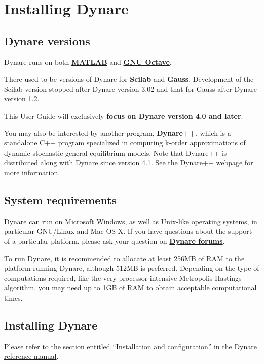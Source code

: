 \documentclass[cn,10pt,math=newtx,citestyle=gb7714-2015,bibstyle=gb7714-2015]{elegantbook}
\begin{document}
	
	\chapter{Installing Dynare}
	
	\section{Dynare versions}
	
	Dynare runs on both \href{http://www.mathworks.com/products/matlab/}{\textbf{MATLAB}} and \href{http://www.octave.org}{\textbf{GNU Octave}}.
	
	There used to be versions of Dynare for \textbf{Scilab} and \textbf{Gauss}. Development of the Scilab version stopped after Dynare version 3.02 and that for Gauss after Dynare version 1.2.
	
	This User Guide will exclusively \textbf{focus on Dynare version 4.0 and later}.
	
	You may also be interested by another program, \textbf{Dynare++}, which is a standalone C++ program specialized in computing k-order approximations of dynamic stochastic general equilibrium models. Note that Dynare++ is distributed along with Dynare since version 4.1. See the \href{http://www.dynare.org/documentation-and-support/dynarepp}{Dynare++ webpage} for more information. 
	
	\section{System requirements}
	Dynare can run on Microsoft Windows, as well as Unix-like operating systems, in particular GNU/Linux and Mac OS X. If you have questions about the support of a particular platform, please ask your question on \href{http://www.dynare.org/phpBB3}{\textbf{Dynare forums}}.
	
	To run Dynare, it is recommended to allocate at least 256MB of RAM to the platform running Dynare, although 512MB is preferred. Depending on the type of computations required, like the very processor intensive Metropolis Hastings algorithm, you may need up to 1GB of RAM to obtain acceptable computational times.
	
	\section{Installing Dynare}
	
	Please refer to the section entitled ``Installation and configuration'' in the \href{http://www.dynare.org/documentation-and-support/manual}{Dynare reference manual}.
	
\end{document}
